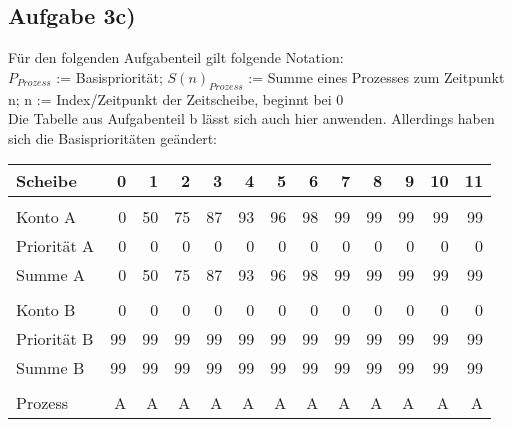 \documentclass{ti2}
\begin{document}
\subsection*{Aufgabe 3c)}
Für den folgenden Aufgabenteil gilt folgende Notation: \\
$P_{Prozess}$ := Basispriorität; $S(n)_{Prozess}$ := Summe eines Prozesses zum Zeitpunkt n; n := Index/Zeitpunkt der Zeitscheibe, beginnt bei 0 \\
Die Tabelle aus Aufgabenteil b lässt sich auch hier anwenden. Allerdings haben sich die Basisprioritäten geändert: 
\begin{table}[htbp]
\begin{adjustbox}{max width=\textwidth}
\begin{tabular}{|l|r|r|r|r|r|r|r|r|r|r|r|r|}
\hline
Scheibe  & 0 & 1 & 2 & 3 & 4 & 5 & 6 & 7 & 8 & 9 & 10 & 11 \\ \hline
 & \multicolumn{1}{l|}{} & \multicolumn{1}{l|}{} & \multicolumn{1}{l|}{} & \multicolumn{1}{l|}{} & \multicolumn{1}{l|}{} & \multicolumn{1}{l|}{} & \multicolumn{1}{l|}{} & \multicolumn{1}{l|}{} & \multicolumn{1}{l|}{} & \multicolumn{1}{l|}{} & \multicolumn{1}{l|}{} & \multicolumn{1}{l|}{} \\ \hline
Konto A & 0 & 50 & 75 & 87 & 93 & 96 & 98 & 99 & 99 & 99 & 99 & 99 \\ \hline
Priorität A & 0 & 0 & 0 & 0 & 0 & 0 & 0 & 0 & 0 & 0 & 0 & 0 \\ \hline
Summe A & 0 & 50 & 75 & 87 & 93 & 96 & 98 & 99 & 99 & 99 & 99 & 99 \\ \hline
 & \multicolumn{1}{l|}{} & \multicolumn{1}{l|}{} & \multicolumn{1}{l|}{} & \multicolumn{1}{l|}{} & \multicolumn{1}{l|}{} & \multicolumn{1}{l|}{} & \multicolumn{1}{l|}{} & \multicolumn{1}{l|}{} & \multicolumn{1}{l|}{} & \multicolumn{1}{l|}{} & \multicolumn{1}{l|}{} & \multicolumn{1}{l|}{} \\ \hline
Konto B & 0 & 0 & 0 & 0 & 0 & 0 & 0 & 0 & 0 & 0 & 0 & 0 \\ \hline
Priorität B & 99 & 99 & 99 & 99 & 99 & 99 & 99 & 99 & 99 & 99 & 99 & 99 \\ \hline
Summe B & 99 & 99 & 99 & 99 & 99 & 99 & 99 & 99 & 99 & 99 & 99 & 99 \\ \hline
 & \multicolumn{1}{l|}{} & \multicolumn{1}{l|}{} & \multicolumn{1}{l|}{} & \multicolumn{1}{l|}{} & \multicolumn{1}{l|}{} & \multicolumn{1}{l|}{} & \multicolumn{1}{l|}{} & \multicolumn{1}{l|}{} & \multicolumn{1}{l|}{} & \multicolumn{1}{l|}{} & \multicolumn{1}{l|}{} & \multicolumn{1}{l|}{} \\ \hline
Prozess & A & A & A & A & A & A & A & A & A & A & A & A \\ \hline
\end{tabular}
\end{adjustbox}
\end{table}
\end{document}
